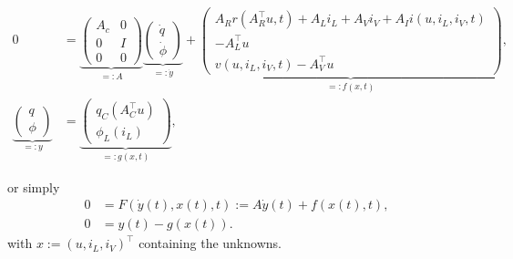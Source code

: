 \begin{align*}
	0 &=
	\underbrace{ 
	\left( \begin{matrix}
		A_c & 0 \\
		0 & I \\
		0 & 0
	\end{matrix} \right)}_{=:A}
	\underbrace{
	\left( \begin{matrix}
		\dot{q} \\
		\dot{\phi} 
	\end{matrix} \right)}_{=:\dot{y}}
	+
	\underbrace{
	\left( \begin{matrix}
		A_R r(A_R^\top u,t) + A_L i_L + A_V i_V + A_I i(u, i_L, i_V, t) \\
		- A_L^\top u \\
		v(u, i_L, i_V, t) - A_V^\top u
	\end{matrix} \right)}_{=:f(x,t)}, \\
	\underbrace{
	\left( \begin{matrix}
		q \\
		\phi 
	\end{matrix} \right)}_{=:y} 
	&=
	\underbrace{
	\left( \begin{matrix}
		q_C(A_C^\top u) \\
		\phi_L(i_L) 
	\end{matrix} \right)}_{=:g(x,t)},
\end{align*}

or simply
\begin{align*}
	0 &= F(\dot{y}(t), x(t), t) :=A \dot{y}(t) + f(x(t),t), \\
	0 &= y(t) - g(x(t)).
\end{align*}
with $x:=(u, i_L, i_V)^\top$ containing the unknowns.

